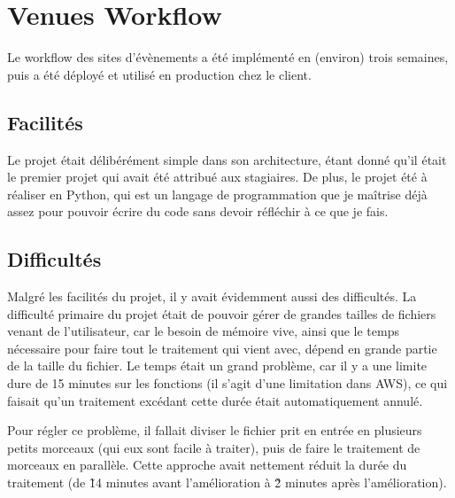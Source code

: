 
\section{Venues Workflow}

\begin{flushleft}
  Le workflow des sites d'évènements a été implémenté en
  (environ) trois semaines, puis a été déployé et utilisé
  en production chez le client.
\end{flushleft}

\subsection*{Facilités}

\begin{flushleft}
  Le projet était délibérément simple dans son architecture,
  étant donné qu'il était le premier projet qui avait
  été attribué aux stagiaires. De plus, le projet été à
  réaliser en Python, qui est un langage de programmation
  que je maîtrise déjà assez pour pouvoir écrire du code
  sans devoir réfléchir à ce que je fais.
\end{flushleft}

\subsection*{Difficultés}

\begin{flushleft}
  Malgré les facilités du projet, il y avait évidemment
  aussi des difficultés. La difficulté primaire du projet
  était de pouvoir gérer de grandes tailles de fichiers
  venant de l'utilisateur, car le besoin de mémoire vive,
  ainsi que le temps nécessaire pour faire tout le traitement
  qui vient avec, dépend en grande partie de la taille du fichier.
  Le temps était un grand problème, car il y a une limite dure de
  15 minutes sur les fonctions (il s'agit d'une limitation dans AWS),
  ce qui faisait qu'un traitement excédant cette durée était
  automatiquement annulé.
\end{flushleft}

\begin{flushleft}
  Pour régler ce problème, il fallait diviser le fichier prit en
  entrée en plusieurs petits morceaux (qui eux sont facile à traiter),
  puis de faire le traitement de morceaux en parallèle. Cette approche
  avait nettement réduit la durée du traitement (de \~14 minutes avant
  l'amélioration à \~2 minutes après l'amélioration).
\end{flushleft}

